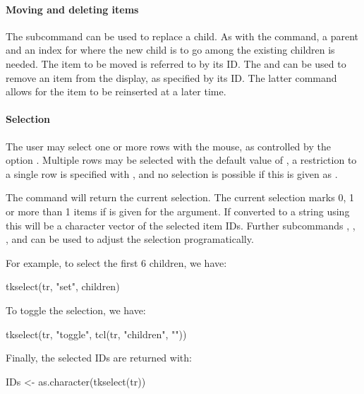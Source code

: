 \paragraph{Moving and deleting items}
The  subcommand can be used to replace a
child. As with the  command, a parent and an index for
where the new child is to go among the existing children is needed. The
item to be moved is referred to by its ID. The
 and 
can be used to remove an item from the display, as specified by its
ID. The latter command allows for the item to be reinserted at a later
time.


\paragraph{Selection}
The user may select one or more rows with the mouse, as controlled by
the option . Multiple rows may be
selected with the default value of , a restriction to
a single row is specified with , and no selection is
possible if this is given as .

The  command will return the current
selection. The current selection marks 0, 1 or more than 1 items if
 is given for the  argument.  If
converted to a string using  this will be a
character vector of the selected item IDs. Further subcommands
, , , and  can be used
to adjust the selection programatically.

For example, to select the first 6 children, we have:
\begin{Schunk}
\begin{Sinput}
 tkselect(tr, "set", children)
\end{Sinput}
\end{Schunk}
%
To toggle the selection, we have:
\begin{Schunk}
\begin{Sinput}
 tkselect(tr, "toggle", tcl(tr, "children", ""))
\end{Sinput}
\end{Schunk}
%
Finally, the selected IDs are returned with:
\begin{Schunk}
\begin{Sinput}
 IDs <- as.character(tkselect(tr))
\end{Sinput}
\end{Schunk}

